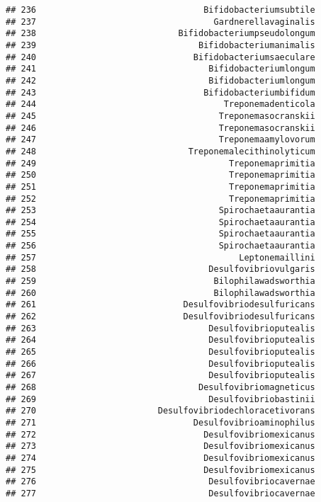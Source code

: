 \documentclass[
]{article}
\begin{document}
\begin{verbatim}
## 236                                 Bifidobacteriumsubtile
## 237                                   Gardnerellavaginalis
## 238                            Bifidobacteriumpseudolongum
## 239                                Bifidobacteriumanimalis
## 240                               Bifidobacteriumsaeculare
## 241                                  Bifidobacteriumlongum
## 242                                  Bifidobacteriumlongum
## 243                                 Bifidobacteriumbifidum
## 244                                     Treponemadenticola
## 245                                    Treponemasocranskii
## 246                                    Treponemasocranskii
## 247                                    Treponemaamylovorum
## 248                              Treponemalecithinolyticum
## 249                                      Treponemaprimitia
## 250                                      Treponemaprimitia
## 251                                      Treponemaprimitia
## 252                                      Treponemaprimitia
## 253                                    Spirochaetaaurantia
## 254                                    Spirochaetaaurantia
## 255                                    Spirochaetaaurantia
## 256                                    Spirochaetaaurantia
## 257                                        Leptonemaillini
## 258                                  Desulfovibriovulgaris
## 259                                   Bilophilawadsworthia
## 260                                   Bilophilawadsworthia
## 261                             Desulfovibriodesulfuricans
## 262                             Desulfovibriodesulfuricans
## 263                                  Desulfovibrioputealis
## 264                                  Desulfovibrioputealis
## 265                                  Desulfovibrioputealis
## 266                                  Desulfovibrioputealis
## 267                                  Desulfovibrioputealis
## 268                                Desulfovibriomagneticus
## 269                                  Desulfovibriobastinii
## 270                        Desulfovibriodechloracetivorans
## 271                               Desulfovibrioaminophilus
## 272                                 Desulfovibriomexicanus
## 273                                 Desulfovibriomexicanus
## 274                                 Desulfovibriomexicanus
## 275                                 Desulfovibriomexicanus
## 276                                  Desulfovibriocavernae
## 277                                  Desulfovibriocavernae

\end{verbatim}
\end{document}
